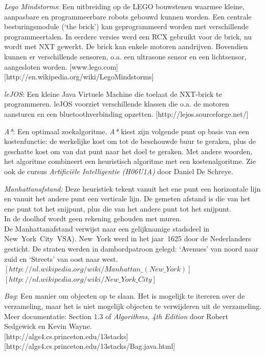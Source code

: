 \documentclass[eind]{penoverslag}
\begin{document}
\begin{thebibliography}{9}

\textit{Lego Mindstorms}:  Een uitbreiding op de LEGO bouwstenen waarmee kleine, aanpasbare en programmeerbare robots gebouwd kunnen worden. Een centrale besturingsmodule (`the brick') kan geprogrammeerd worden met verschillende programmeertalen. In eerdere versies werd een RCX gebruikt voor de brick, nu wordt met NXT gewerkt. De brick kan enkele motoren aandrijven. Bovendien kunnen er verschillende sensoren, o.a. een ultrasone sensor en een lichtsensor, aangesloten worden.  \mbox{[www.lego.com]} \mbox{[http://en.wikipedia.org/wiki/Lego\textendash Mindstorms]}

\textit{leJOS}: Een kleine Java Virtuele Machine die toelaat de NXT-brick te programmeren. leJOS voorziet verschillende klassen die o.a. de motoren aansturen en een bluetoothverbinding opzetten.  \mbox{[http://lejos.sourceforge.net/]}

\textit{A*}: Een optimaal zoekalgoritme. \textit{A*} kiest zijn volgende punt op basis van een kostenfunctie: de werkelijke kost om tot de beschouwde buur te geraken, plus de geschatte kost om van dat punt naar het doel te geraken. Met andere woorden, het algoritme combineert een heuristisch algoritme met een kostenalgoritme. Zie ook de cursus \textit{Artifici\"ele Intelligentie (H06U1A)} door Daniel De Schreye.

\textit{Manhattanafstand:} Deze heuristiek tekent vanuit het ene punt een horizontale lijn en vanuit het andere punt een verticale lijn. De gemeten afstand is die van het ene punt tot het snijpunt, plus die van het andere punt tot het snijpunt.\\
In de doolhof wordt geen rekening gehouden met muren.\\
De Manhattanafstand verwijst naar een gelijknamige stadsdeel in New~York~City~VSA). New~York werd in het jaar~1625 door de Nederlanders gesticht. De straten werden in dambordpatroon gelegd: `Avenues' van noord naar zuid en `Streets' van oost naar west.\\
\mbox{$[http://nl.wikipedia.org/wiki/Manhattan\_(New\_York)]$}\\ \mbox{$[http://nl.wikipedia.org/wiki/New\_York\_City]$}


\textit{Bag}: Een manier om objecten op te slaan. Het is mogelijk te itereren over de verzameling, maar het is niet mogelijk objecten te verwijderen uit de verzameling. Meer documentatie: Section 1.3 of \textit{Algorithms, 4th Edition} door Robert Sedgewick en Kevin Wayne.\\
\mbox{[http://algs4.cs.princeton.edu/13stacks]} \mbox{[http://algs4.cs.princeton.edu/13stacks/Bag.java.html]}
\end{thebibliography}
\end{document}
